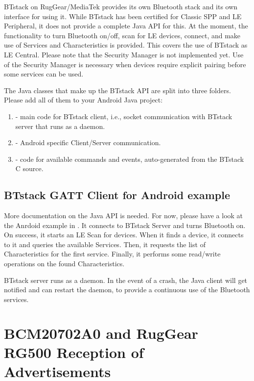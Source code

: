 \documentclass[a4paper,titlepage,oneside,12pt]{amsart} %
\begin{document}
BTstack on RugGear/MediaTek provides its own Bluetooth stack and its own interface for using it. While BTstack has been certified for Classic SPP and LE Peripheral, it does not provide a complete Java API for this. At the moment, the functionality to turn Bluetooth on/off, scan for LE devices, connect, and make use of Services and Characteristics is provided. This covers the use of BTstack as LE Central. Please note that the Security Manager is not implemented yet. Use of the Security Manager is necessary when devices require explicit pairing before some services can be used.

 The Java classes that make up the BTstack API  are split into three folders. Please add all of them to your Android Java project:
 
 \begin{enumerate}
\item {} - main code for BTstack client, i.e., socket communication with BTstack server that runs as a daemon.
\item {} - Android specific Client/Server communication.
\item {} -  code for available commands and events, auto-generated from the BTstack C source.
\end{enumerate}

\subsection{BTstack GATT Client for Android example}
More documentation on the Java API is needed. For now, please have a look at the Anrdoid example in . It connects to BTstack Server and turns Bluetooth on. On success, it starts an LE Scan for devices. When it finds a device, it connects to it and queries the available Services. Then, it requests the list of Characteristics for the first service. Finally, it performs some read/write operations on the found Characteristics.

BTstack server runs as a daemon. In the event of a crash, the Java client will get notified and can restart the daemon, to provide a continuous use of the Bluetooth services.

\section{BCM20702A0 and RugGear RG500 Reception of Advertisements}
\label{ss:measurements}
\end{document}
